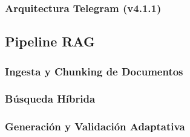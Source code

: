 \subsubsection{Arquitectura Telegram (v4.1.1)}
\label{subsubsec:arquitectura-telegram}


\subsection{Pipeline RAG}
\label{subsec:pipeline-rag}

\subsubsection{Ingesta y Chunking de Documentos}
\label{subsubsec:ingesta-chunking}


\subsubsection{B\'usqueda H\'ibrida}
\label{subsubsec:busqueda-hibrida-impl}


\subsubsection{Generaci\'on y Validaci\'on Adaptativa}
\label{subsubsec:generacion-validacion}


